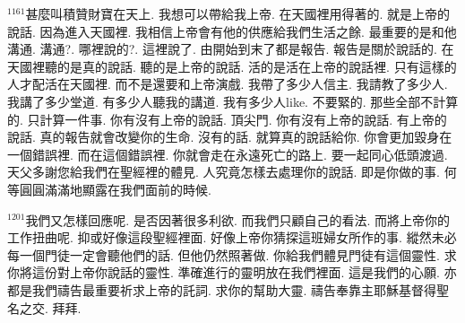 \documentclass{book}
\begin{document}
$^{1161}$甚麼叫積贊財寶在天上.
我想可以帶給我上帝.
在天國裡用得著的.
就是上帝的說話.
因為進入天國裡.
我相信上帝會有他的供應給我們生活之餘.
最重要的是和他溝通.
溝通?.
哪裡說的?.
這裡說了.
由開始到末了都是報告.
報告是關於說話的.
在天國裡聽的是真的說話.
聽的是上帝的說話.
活的是活在上帝的說話裡.
只有這樣的人才配活在天國裡.
而不是還要和上帝演戲.
我帶了多少人信主.
我請教了多少人.
我講了多少堂道.
有多少人聽我的講道.
我有多少人like.
不要緊的.
那些全部不計算的.
只計算一件事.
你有沒有上帝的說話.
頂尖門.
你有沒有上帝的說話.
有上帝的說話.
真的報告就會改變你的生命.
沒有的話.
就算真的說話給你.
你會更加毀身在一個錯誤裡.
而在這個錯誤裡.
你就會走在永遠死亡的路上.
要一起同心低頭渡過.
天父多謝您給我們在聖經裡的體見.
人究竟怎樣去處理你的說話.
即是你做的事.
何等圓圓滿滿地顯露在我們面前的時候.

$^{1201}$我們又怎樣回應呢.
是否因著很多利欲.
而我們只顧自己的看法.
而將上帝你的工作扭曲呢.
抑或好像這段聖經裡面.
好像上帝你猜探這班婦女所作的事.
縱然未必每一個門徒一定會聽他們的話.
但他仍然照著做.
你給我們體見門徒有這個靈性.
求你將這份對上帝你說話的靈性.
準確進行的靈明放在我們裡面.
這是我們的心願.
亦都是我們禱告最重要祈求上帝的託詞.
求你的幫助大靈.
禱告奉靠主耶穌基督得聖名之交.
拜拜.
\newpage
\end{document}
